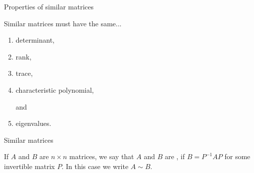 \documentclass{ximera}
\begin{document}

Properties of similar matrices
\begin{expandable}
Similar matrices must have the same...
\begin{enumerate}
    \item determinant,

    \item rank,

    \item trace,

    \item characteristic polynomial, 

    and

    \item eigenvalues.

\end{enumerate}
\end{expandable}


Similar matrices
\begin{expandable}
    If $A$ and $B$ are $n \times n$ matrices, we say that $A$ and $B$ are , if $B = P^{-1}AP$ for some invertible matrix $P$.  In this case we write $A \sim B$.
\end{expandable}


 
\end{document}
